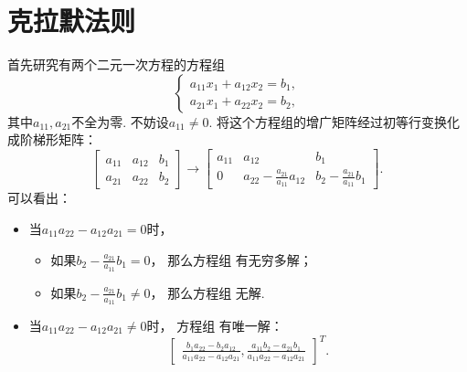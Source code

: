 \section{克拉默法则}
首先研究有两个二元一次方程的方程组\begin{equation}\label{equation:克拉默法则.两个二元一次方程}
	\left\{ \begin{array}{l}
		a_{11} x_1 + a_{12} x_2 = b_1, \\
		a_{21} x_1 + a_{22} x_2 = b_2,
	\end{array} \right.
\end{equation}
其中\(a_{11},a_{21}\)不全为零.
不妨设\(a_{11}\neq0\).
将这个方程组的增广矩阵经过初等行变换化成阶梯形矩阵：\begin{equation*}
	\begin{bmatrix}
		a_{11} & a_{12} & b_1 \\
		a_{21} & a_{22} & b_2
	\end{bmatrix}
	\to \begin{bmatrix}
		a_{11} & a_{12} & b_1 \\
		0 & a_{22}-\frac{a_{21}}{a_{11}} a_{12} & b_2-\frac{a_{21}}{a_{11}} b_1
	\end{bmatrix}.
\end{equation*}
可以看出：\begin{itemize}
	\item 当\(a_{11} a_{22} - a_{12} a_{21} = 0\)时，
	\begin{itemize}
		\item 如果\(b_2-\frac{a_{21}}{a_{11}} b_1=0\)，
		那么方程组  有无穷多解；
		\item 如果\(b_2-\frac{a_{21}}{a_{11}} b_1\neq0\)，
		那么方程组  无解.
	\end{itemize}

	\item 当\(a_{11} a_{22} - a_{12} a_{21} \neq 0\)时，
	方程组  有唯一解：\begin{equation*}
		\begin{bmatrix}
			\frac{b_1 a_{22} - b_2 a_{12}}{a_{11} a_{22} - a_{12} a_{21}},
			\frac{a_{11} b_2 - a_{21} b_1}{a_{11} a_{22} - a_{12} a_{21}}
		\end{bmatrix}^T.
	\end{equation*}
\end{itemize}

